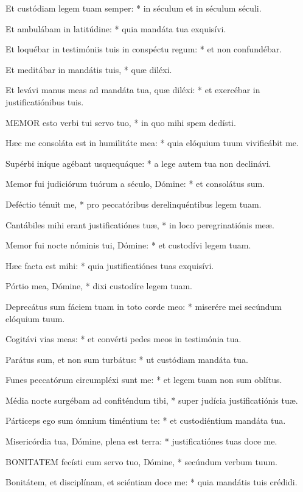 Et custódiam legem tuam semper: * in séculum et in séculum séculi.

Et ambulábam in latitúdine: * quia mandáta tua exquisívi.

Et loquébar in testimóniis tuis in conspéctu regum: * et non confundébar.

Et meditábar in mandátis tuis, * quæ diléxi.

Et levávi manus meas ad mandáta tua, quæ diléxi: * et exercébar in justificatiónibus tuis.


\lettrine[lines=2]{M}{EMOR} esto verbi tui servo tuo, * in quo mihi spem dedísti.

Hæc me consoláta est in humilitáte mea: * quia elóquium tuum vivificábit me.

Supérbi iníque agébant usquequáque: * a lege autem tua non declinávi.

Memor fui judiciórum tuórum a século, Dómine: * et consolátus sum.

Deféctio ténuit me, * pro peccatóribus derelinquéntibus legem tuam.

Cantábiles mihi erant justificatiónes tuæ, * in loco peregrinatiónis meæ.

Memor fui nocte nóminis tui, Dómine: * et custodívi legem tuam.

Hæc facta est mihi: * quia justificatiónes tuas exquisívi.

Pórtio mea, Dómine, * dixi custodíre legem tuam.

Deprecátus sum fáciem tuam in toto corde meo: * miserére mei secúndum elóquium tuum.

Cogitávi vias meas: * et convérti pedes meos in testimónia tua.

Parátus sum, et non sum turbátus: * ut custódiam mandáta tua.

Funes peccatórum circumpléxi sunt me: * et legem tuam non sum oblítus.

Média nocte surgébam ad confiténdum tibi, * super judícia justificatiónis tuæ.

Párticeps ego sum ómnium timéntium te: * et custodiéntium mandáta tua.

Misericórdia tua, Dómine, plena est terra: * justificatiónes tuas doce me.


\lettrine[lines=2]{B}{ONITATEM} fecísti cum servo tuo, Dómine, * secúndum verbum tuum.

Bonitátem, et disciplínam, et sciéntiam doce me: * quia mandátis tuis crédidi.

